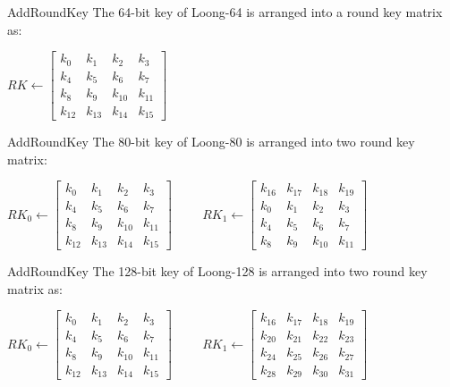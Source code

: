 \begin{frame}{AddRoundKey}
    The 64-bit key of Loong-64 is arranged into a round key matrix as:\\
    \begin{center}
    $ RK \leftarrow 
    \begin{bmatrix}
    k_0 & k_1 & k_2 & k_3 \\
    k_4 & k_5 & k_6 & k_7 \\
    k_8 & k_9 & k_{10} & k_{11} \\
    k_{12} & k_{13} & k_{14} & k_{15}
    \end{bmatrix}$
    \end{center}
\end{frame}
\begin{frame}{AddRoundKey}
    The 80-bit key of Loong-80 is arranged into two round key matrix:\\
    \begin{center}
    $ RK_0 \leftarrow 
    \begin{bmatrix}
    k_0 & k_1 & k_2 & k_3 \\
    k_4 & k_5 & k_6 & k_7 \\
    k_8 & k_9 & k_{10} & k_{11} \\
    k_{12} & k_{13} & k_{14} & k_{15}
    \end{bmatrix} \hspace{1cm}
    RK_1 \leftarrow 
    \begin{bmatrix}
    k_{16} & k_{17} & k_{18} & k_{19}\\
    k_0 & k_1 & k_2 & k_3 \\
    k_4 & k_5 & k_6 & k_7 \\
    k_8 & k_9 & k_{10} & k_{11}
    \end{bmatrix}$
    \end{center}
\end{frame}
\begin{frame}{AddRoundKey}
    The 128-bit key of Loong-128 is arranged into two round key matrix as:\\
    \begin{center}
    $ RK_0 \leftarrow 
    \begin{bmatrix}
    k_0 & k_1 & k_2 & k_3 \\
    k_4 & k_5 & k_6 & k_7 \\
    k_8 & k_9 & k_{10} & k_{11} \\
    k_{12} & k_{13} & k_{14} & k_{15}
    \end{bmatrix} \hspace{1cm}
    RK_1 \leftarrow 
    \begin{bmatrix}
    k_{16} & k_{17} & k_{18} & k_{19}\\
    k_{20} & k_{21} & k_{22} & k_{23} \\
    k_{24} & k_{25} & k_{26} & k_{27} \\
    k_{28} & k_{29} & k_{30} & k_{31}
    \end{bmatrix}$
    \end{center}
\end{frame}
